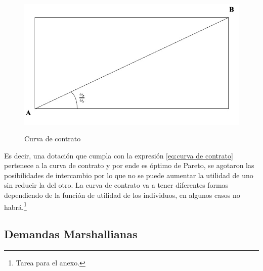 \begin{figure}[htbp]
    \centering
    \caption{Curva de contrato}
    \includegraphics[width=\textwidth]{Figuras/EG Curva de contrato.jpeg}
    \label{fig:diapositiva3}
\end{figure}
Es decir, una dotación que cumpla con la expresión \ref{eq:curva de contrato} pertenece a la curva de contrato y por ende es óptimo de Pareto, se agotaron las posibilidades de intercambio por lo que no se puede aumentar la utilidad de uno sin reducir la del otro. La curva de contrato va a tener diferentes formas dependiendo de la función de utilidad de los individuos, en algunos casos no habrá.\footnote{Tarea para el anexo.} 

\subsection{Demandas Marshallianas}


